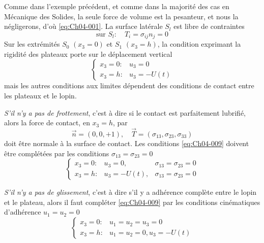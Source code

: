 Comme dans l'exemple précédent, et comme dans la majorité des cas en Mécanique des Solides, la seule force de volume est la pesanteur, et nous la négligerons, d'où \eqref{eq:Ch04-001}.
La surface latérale $S_l$ est libre de contraintes
\begin{equation}
    \text{sur } S_l:\quad T_i = \sigma_{ij} n_j = 0
    \label{eq:Ch04-008}
\end{equation}
Sur les extrémités $S_0$ $(x_3=0)$ et $S_1$ $(x_3=h)$, la condition exprimant la rigidité des plateaux porte sur le déplacement vertical
\begin{equation}
    \begin{cases}
        x_3 = 0: & u_3 = 0 \\
        x_3 = h: & u_3 = -U(t)
    \end{cases}
    \label{eq:Ch04-009}
\end{equation}
mais les autres conditions aux limites dépendent des conditions de contact entre les plateaux et le lopin.

\emph{S'il n'y a pas de frottement}, c'est à dire si le contact est parfaitement lubrifié, alors la force de contact, en $x_3=h$, par
\begin{equation}
    \vec{n} = \left( 0,0,+1 \right), \quad \vec{T} = \left( \sigma_{13}, \sigma_{23}, \sigma_{33} \right)
    \label{eq:Ch04-010}
\end{equation}
doit être normale à la surface de contact.
Les conditions \eqref{eq:Ch04-009} doivent être complétées par les conditions $\sigma_{13} = \sigma_{23} = 0$
\begin{equation}
    \left\{
    \begin{aligned}
        x_3 = 0: & u_3 = 0, & \sigma_{13} = \sigma_{23} = 0 \\
        x_3 = h: & u_3 = -U(t), & \sigma_{13} = \sigma_{23} = 0
    \end{aligned}
    \right.
    \label{eq:Ch04-011}
\end{equation}

\emph{S'il n'y a pas de glissement}, c'est à dire s'il y a adhérence complète entre le lopin et le plateau, alors il faut compléter \eqref{eq:Ch04-009} par les conditions cinématiques d'adhérence $u_1 = u_2 = 0$
\begin{equation}
    \begin{cases}
        x_3 = 0: & u_1 = u_2 = u_3 = 0 \\
        x_3 = h: & u_1 = u_2 = 0, u_3 = -U(t)
    \end{cases}
    \label{eq:Ch04-012}
\end{equation}

